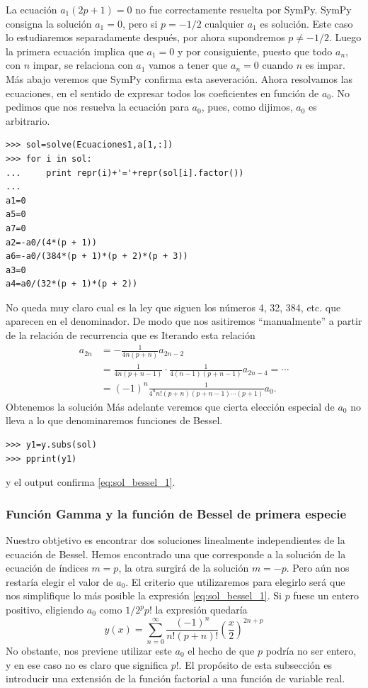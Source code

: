 \documentclass{article}
\newcounter{cor_cont}
\begin{document}
 La ecuación $a_1(2p+1)=0$ no fue correctamente resuelta por SymPy. SymPy consigna la solución $a_1=0$, pero si  $p=-1/2$ cualquier $a_1$ es solución. Este caso lo estudiaremos separadamente después, por ahora supondremos $p\neq -1/2$. Luego la primera ecuación implica que $a_1=0$ y por consiguiente, puesto que todo $a_n$, con $n$ impar, se relaciona con $a_1$ vamos a tener que $a_n=0$ cuando $n$ es impar. Más abajo veremos que SymPy confirma esta aseveración. Ahora resolvamos las ecuaciones, en el sentido de expresar todos los coeficientes en función de $a_0$. No pedimos que nos resuelva la ecuación para $a_0$, pues, como dijimos, $a_0$ es arbitrario. 


\begin{lstlisting}
>>> sol=solve(Ecuaciones1,a[1,:])
>>> for i in sol:
...     print repr(i)+'='+repr(sol[i].factor())
... 
a1=0
a5=0
a7=0
a2=-a0/(4*(p + 1))
a6=-a0/(384*(p + 1)*(p + 2)*(p + 3))
a3=0
a4=a0/(32*(p + 1)*(p + 2))

\end{lstlisting}
No queda muy claro cual es la ley que siguen los números 4, 32, 384, etc. que aparecen en el denominador. De modo que nos asitiremos ``manualmente'' a partir de la relación de recurrencia que es
Iterando esta relación
\[
\begin{split}
  a_{2n}&=-\frac{1}{4n(p+n)}a_{2n-2}\\
       &=\frac{1}{4n(p+n-1)}\cdot\frac{1}{4(n-1)(p+n-1)}a_{2n-4}=\cdots\\
       & =(-1)^n\frac{1}{4^nn!(p+n)(p+n-1)\cdots (p+1)}a_{0}.
\end{split}
\]
Obtenemos la solución 
Más adelante veremos que cierta elección especial de $a_0$ no lleva a lo que denominaremos funciones de Bessel.
\begin{lstlisting}
>>> y1=y.subs(sol)
>>> pprint(y1)
\end{lstlisting}
y el output confirma \eqref{eq:sol_bessel_1}.

\subsubsection{Función Gamma y la función de Bessel de primera especie}

Nuestro obtjetivo es encontrar dos soluciones linealmente independientes de la ecuación de Bessel. Hemos encontrado una que corresponde a la solución de la ecuación de índices $m=p$, la otra surgirá de la solución $m=-p$. Pero aún nos restaría elegir el valor de $a_0$. El criterio que utilizaremos para elegirlo será que nos simplifique lo más posible la expresión  \eqref{eq:sol_bessel_1}. Si $p$ fuese un entero positivo, eligiendo $a_0$ como $1/2^pp!$ la expresión quedaría
\[y(x)=\sum_{n=0}^{\infty}\frac{(-1)^n}{n!(p+n)!}\left(\frac{x}{2}\right)^{2n+p}\]
No obstante, nos previene utilizar este $a_0$ el hecho de que $p$ podría no ser entero, y en ese caso no es claro que significa $p!$. El propósito de esta subsección es introducir una extensión de la función factorial a una función de variable real. 
\end{document}
